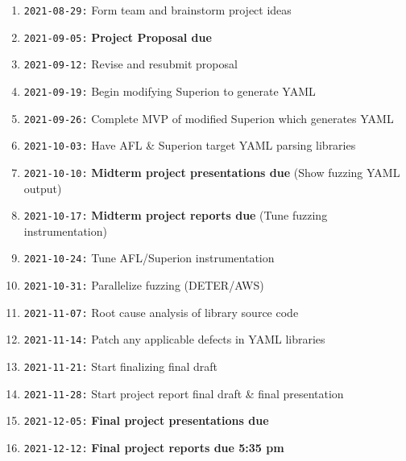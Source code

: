 \documentclass[12pt]{diazessay}
\begin{document}
\begin{enumerate}[label={}]
	\item \texttt{2021-08-29:} Form team and brainstorm project ideas
	\item \texttt{2021-09-05:} \textbf{Project Proposal due}
	\item \texttt{2021-09-12:} Revise and resubmit proposal
	\item \texttt{2021-09-19:} Begin modifying Superion to generate YAML
	\item \texttt{2021-09-26:} Complete MVP of modified Superion which generates YAML
	\item \texttt{2021-10-03:} Have AFL \& Superion target YAML parsing libraries
	\item \texttt{2021-10-10:} \textbf{Midterm project presentations due} \hfill (Show fuzzing YAML output)
	\item \texttt{2021-10-17:} \textbf{Midterm project reports due} \hfill (Tune fuzzing instrumentation)
	\item \texttt{2021-10-24:} Tune AFL/Superion instrumentation 
	\item \texttt{2021-10-31:} Parallelize fuzzing (DETER/AWS)
	\item \texttt{2021-11-07:} Root cause analysis of library source code
	\item \texttt{2021-11-14:} Patch any applicable defects in YAML libraries
	\item \texttt{2021-11-21:} Start finalizing final draft
	\item \texttt{2021-11-28:} Start project report final draft \& final presentation
	\item \texttt{2021-12-05:} \textbf{Final project presentations due}
	\item \texttt{2021-12-12:} \textbf{Final project reports due 5:35 pm}
\end{enumerate}


\clearpage


\end{document}
